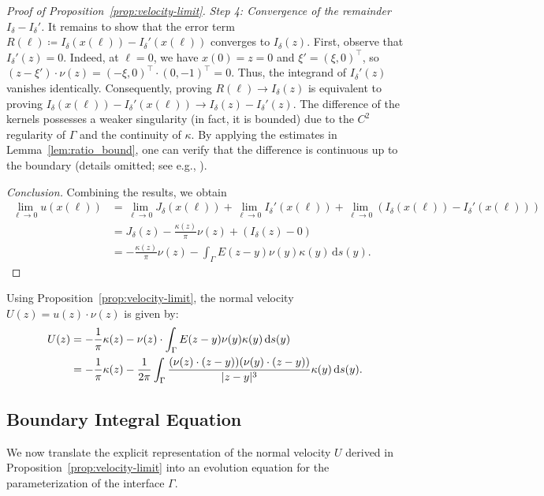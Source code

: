 \documentclass{article}
\theoremstyle{remark}
\theoremstyle{definition}
\numberwithin{equation}{section}
\begin{document}
\begin{proof}[Proof of Proposition~\ref{prop:velocity-limit}]
    \textit{Step 4: Convergence of the remainder $I_\delta - I_\delta'$.}
    It remains to show that the error term $R(\ell) \coloneqq I_\delta(x(\ell)) - I_\delta'(x(\ell))$ converges to $I_\delta(z)$.
    First, observe that $I_\delta'(z) = 0$. Indeed, at $\ell=0$, we have $x(0)=z=0$ and $\xi'=(\xi, 0)^\top$, so $(z-\xi')\cdot\nu(z) = (-\xi, 0)^\top \cdot (0, -1)^\top = 0$. Thus, the integrand of $I_\delta'(z)$ vanishes identically.
    Consequently, proving $R(\ell) \to I_\delta(z)$ is equivalent to proving $I_\delta(x(\ell)) - I_\delta'(x(\ell)) \to I_\delta(z) - I_\delta'(z)$.
    The difference of the kernels possesses a weaker singularity (in fact, it is bounded) due to the $C^2$ regularity of $\Gamma$ and the continuity of $\kappa$.
    By applying the estimates in Lemma~\ref{lem:ratio_bound}, one can verify that the difference is continuous up to the boundary (details omitted; see e.g., \cite[Chapter~5]{friedman1964partial}).
    
    \textit{Conclusion.}
    Combining the results, we obtain
    \begin{align*}
        \lim_{\ell \to 0} u(x(\ell)) 
        &= \lim_{\ell \to 0} J_\delta(x(\ell)) + \lim_{\ell \to 0} I_\delta'(x(\ell)) + \lim_{\ell \to 0} (I_\delta(x(\ell)) - I_\delta'(x(\ell))) \\
        &= J_\delta(z) - \frac{\kappa(z)}{\pi} \nu(z) + (I_\delta(z) - 0) \\
        &= -\frac{\kappa(z)}{\pi} \nu(z) - \int_\Gamma E(z - y) \nu(y) \kappa(y) \, \mathrm{d}s(y).
    \end{align*}
\end{proof}

Using Proposition~\ref{prop:velocity-limit}, the normal velocity $U(z) = u(z) \cdot \nu(z)$ is given by:
\begin{align}
    U(z) &= -\frac{1}{\pi} \kappa(z) - \nu(z) \cdot \int_\Gamma E(z - y) \nu(y) \kappa(y) \, \mathrm{d}s(y) \notag \\
    &= -\frac{1}{\pi} \kappa(z) - \frac{1}{2\pi} \int_\Gamma \frac{(\nu(z) \cdot (z-y)) (\nu(y) \cdot (z-y))}{|z-y|^3} \kappa(y) \, \mathrm{d}s(y).
    \label{eq:normal_velocity_explicit}
\end{align}


\subsection{Boundary Integral Equation}

We now translate the explicit representation of the normal velocity $U$ derived in Proposition~\ref{prop:velocity-limit} into an evolution equation for the parameterization of the interface $\Gamma$.
\end{document}
